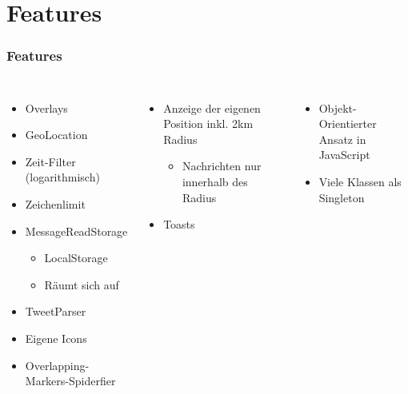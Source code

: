 \documentclass[aspectratio=43]{beamer}
\begin{document}
\section{Features}
\begin{frame}
	\frametitle{Features}
	\begin{columns}
			\begin{itemize}
			\item Overlays
			\item GeoLocation
			\item Zeit-Filter (logarithmisch)
			\item Zeichenlimit
			\item MessageReadStorage
				\begin{itemize}
				\item LocalStorage
				\item Räumt sich auf
				\end{itemize}
			\item TweetParser
			\item Eigene Icons
			\item Overlapping-Markers-Spiderfier
			\end{itemize}
			\begin{itemize}
			\item Anzeige der eigenen Position inkl. 2km Radius
				\begin{itemize}
					\item Nachrichten nur innerhalb des Radius
				\end{itemize}
			\item Toasts
			\end{itemize}
			\rule{\textwidth}{\fboxrule}
			\begin{itemize}
			\item Objekt-Orientierter Ansatz in JavaScript
			\item Viele Klassen als Singleton
			\end{itemize}
	\end{columns}
\end{frame}

\end{document}
